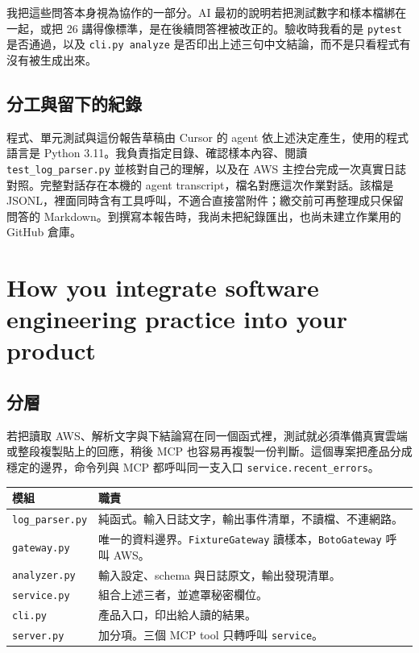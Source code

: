 \documentclass[11pt]{article}
\begin{document}
我把這些問答本身視為協作的一部分。AI 最初的說明若把測試數字和樣本檔綁在一起，或把 26 講得像標準，是在後續問答裡被改正的。驗收時我看的是 \texttt{pytest} 是否通過，以及 \texttt{cli.py analyze} 是否印出上述三句中文結論，而不是只看程式有沒有被生成出來。

\subsection{分工與留下的紀錄}

程式、單元測試與這份報告草稿由 Cursor 的 agent 依上述決定產生，使用的程式語言是 Python 3.11。我負責指定目錄、確認樣本內容、閱讀 \texttt{test\_log\_parser.py} 並核對自己的理解，以及在 AWS 主控台完成一次真實日誌對照。完整對話存在本機的 agent transcript，檔名對應這次作業對話。該檔是 JSONL，裡面同時含有工具呼叫，不適合直接當附件；繳交前可再整理成只保留問答的 Markdown。到撰寫本報告時，我尚未把紀錄匯出，也尚未建立作業用的 GitHub 倉庫。

\section{How you integrate software engineering practice into your product}

\subsection{分層}

若把讀取 AWS、解析文字與下結論寫在同一個函式裡，測試就必須準備真實雲端或整段複製貼上的回應，稍後 MCP 也容易再複製一份判斷。這個專案把產品分成穩定的邊界，命令列與 MCP 都呼叫同一支入口 \texttt{service.recent\_errors}。

\begin{center}
\begin{tabular}{lp{8.2cm}}
\toprule
模組 & 職責 \\
\midrule
\texttt{log\_parser.py} & 純函式。輸入日誌文字，輸出事件清單，不讀檔、不連網路。 \\
\texttt{gateway.py} & 唯一的資料邊界。\texttt{FixtureGateway} 讀樣本，\texttt{BotoGateway} 呼叫 AWS。 \\
\texttt{analyzer.py} & 輸入設定、schema 與日誌原文，輸出發現清單。 \\
\texttt{service.py} & 組合上述三者，並遮罩秘密欄位。 \\
\texttt{cli.py} & 產品入口，印出給人讀的結果。 \\
\texttt{server.py} & 加分項。三個 MCP tool 只轉呼叫 \texttt{service}。 \\
\bottomrule
\end{tabular}
\end{center}
\end{document}
